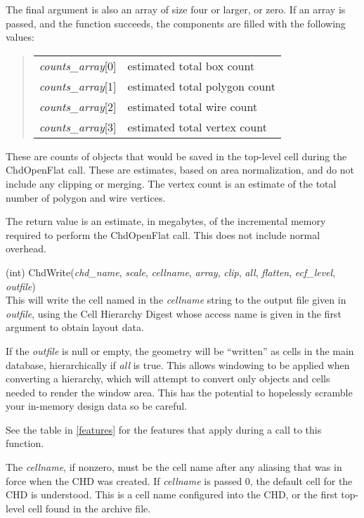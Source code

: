 \begin{description}
The final argument is also an array of size four or larger, or zero. 
If an array is passed, and the function succeeds, the components are
filled with the following values:
\begin{quote}
\begin{tabular}{ll}
{\it counts\_array\/}[0] & estimated total box count\\
{\it counts\_array\/}[1] & estimated total polygon count\\
{\it counts\_array\/}[2] & estimated total wire count\\
{\it counts\_array\/}[3] & estimated total vertex count\\
\end{tabular}
\end{quote}
These are counts of objects that would be saved in the top-level cell
during the {\vt ChdOpenFlat} call.  These are estimates, based on area
normalization, and do not include any clipping or merging.  The vertex
count is an estimate of the total number of polygon and wire vertices.

The return value is an estimate, in megabytes, of the incremental
memory required to perform the {\vt ChdOpenFlat} call.  This does not
include normal overhead.

\item{(int) \vt ChdWrite({\it chd\_name\/}, {\it scale\/}, {\it cellname\/},
 {\it array\/}, {\it clip\/}, {\it all\/}, {\it flatten\/},
 {\it ecf\_level\/}, {\it outfile\/})}\\
This will write the cell named in the {\it cellname} string to the
output file given in {\it outfile}, using the Cell Hierarchy Digest
whose access name is given in the first argument to obtain layout
data.

If the {\it outfile} is null or empty, the geometry will be
``written'' as cells in the main database, hierarchically if {\it all}
is true.  This allows windowing to be applied when converting a
hierarchy, which will attempt to convert only objects and cells needed
to render the window area.  This has the potential to hopelessly
scramble your in-memory design data so be careful.

See the table in \ref{features} for the features that apply during a
call to this function.

The {\it cellname}, if nonzero, must be the cell name after any
aliasing that was in force when the CHD was created.  If {\it
cellname} is passed 0, the default cell for the CHD is understood. 
This is a cell name configured into the CHD, or the first top-level
cell found in the archive file.


\end{description}
